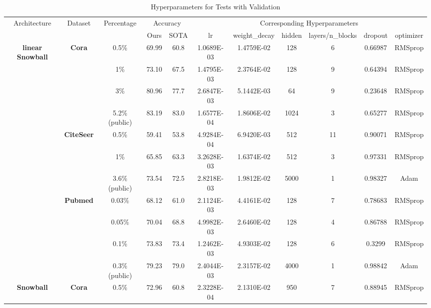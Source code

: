 \documentclass{article}
\begin{document}
\begin{table}[htbp]
\setlength{\tabcolsep}{1.5pt}
  \centering
  \caption{Hyperparameters for Tests with Validation}
  \scriptsize
    \begin{tabular}{ccccc|cccccc}
    \toprule
    \toprule
    \multirow{2}[1]{*}{Architecture} & \multirow{2}[1]{*}{Dataset} & \multirow{2}[1]{*}{Percentage} & \multicolumn{2}{c|}{Accuracy} & \multicolumn{6}{c}{Corresponding Hyperparameters} \\
          &       &       & Ours  & SOTA  & lr    & weight\_decay & hidden & layers/n\_blocks & dropout & optimizer \\
    \midrule
    \multirow{11}[0]{*}{\textbf{linear Snowball}} & \multirow{4}[0]{*}{\textbf{Cora}} & 0.5\% & 69.99 & 60.8  & 1.0689E-03 & 1.4759E-02 & 128   & 6     & 0.66987 & RMSprop \\
          &       & 1\%   & 73.10 & 67.5  & 1.4795E-03 & 2.3764E-02 & 128   & 9     & 0.64394 & RMSprop \\
          &       & 3\%   & 80.96 & 77.7  & 2.6847E-03 & 5.1442E-03 & 64    & 9     & 0.23648 & RMSprop \\
          &       & 5.2\% (public) & 83.19 & 83.0  & 1.6577E-04 & 1.8606E-02 & 1024  & 3     & 0.65277 & RMSprop \\
          & \multirow{3}[0]{*}{\textbf{CiteSeer}} & 0.5\% & 59.41 & 53.8  & 4.9284E-04 & 6.9420E-03 & 512   & 11    & 0.90071 & RMSprop \\
          &       & 1\%   & 65.85 & 63.3  & 3.2628E-03 & 1.6374E-02 & 512   & 3     & 0.97331 & RMSprop \\
          &       & 3.6\% (public) & 73.54 & 72.5  & 2.8218E-03 & 1.9812E-02 & 5000  & 1     & 0.98327 & Adam \\
          & \multirow{4}[0]{*}{\textbf{Pubmed}} & 0.03\% & 68.12 & 61.0  & 2.1124E-03 & 4.4161E-02 & 128   & 7     & 0.78683 & RMSprop \\
          &       & 0.05\% & 70.04 & 68.8  & 4.9982E-03 & 2.6460E-02 & 128   & 4     & 0.86788 & RMSprop \\
          &       & 0.1\% & 73.83 & 73.4  & 1.2462E-03 & 4.9303E-02 & 128   & 6     & 0.3299 & RMSprop \\
          &       & 0.3\% (public) & 79.23 & 79.0  & 2.4044E-03 & 2.3157E-02 & 4000  & 1     & 0.98842 & Adam \\
    \midrule
    \multirow{11}[1]{*}{\textbf{Snowball}} & \multirow{4}[0]{*}{\textbf{Cora}} & 0.5\% & 72.96 & 60.8  & 2.3228E-04 & 2.1310E-02 & 950   & 7     & 0.88945 & RMSprop \\

\end{tabular}
\end{table}
\end{document}
